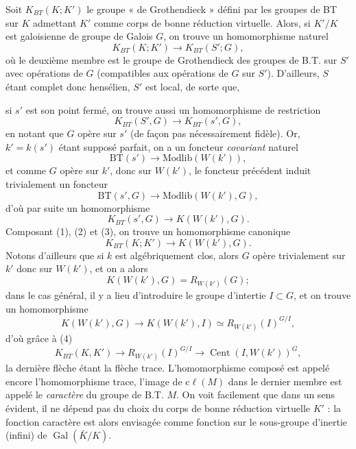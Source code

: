\documentclass[11pt,a4paper]{article}
\begin{document}
Soit $K_{BT}(K; K')$ le groupe « de Grothendieck » défini par les groupes
de BT sur $K$ admettant $K'$ comme corps de bonne réduction virtuelle.
Alors, si $K'/K$ est galoisienne de groupe de Galois $G$, on trouve un
homomorphisme naturel
\[
K_{BT}(K; K') \longrightarrow K_{BT}(S'; G) , \tag{1}
\]
où le deuxième membre est le groupe de Grothendieck des groupes de B.T.
sur $S'$ avec opérations de $G$ (compatibles aux opérations de $G$ sur
$S'$).
D'ailleurs, $S$ étant complet donc hensélien, $S'$ est local, de sorte que,


si $s'$ est son point fermé, on trouve aussi un homomorphisme de
restriction
\[
K_{BT}(S', G) \to K_{BT}(s', G) , \tag{2}
\]
en notant que $G$ opère sur $s'$ (de façon pas nécessairement fidèle).
Or, $k' = k(s')$ étant supposé  parfait, on a un foncteur
\emph{covariant} naturel
\[
\mathrm{BT}(s') \to \mathrm{Modlib}(W(k')) ,
\]
et comme $G$ opère sur $k'$, donc sur $W(k')$, le foncteur précédent induit
trivialement un foncteur
\[
\mathrm{BT}(s', G) \to \mathrm{Modlib}(W(k'), G) ,
\]
d'où par suite un homomorphisme
\[
K_{BT}(s', G) \longrightarrow K(W(k'), G) . \tag{3}
\]
Composant (1), (2) et (3), on trouve un homomorphisme canonique
\[
K_{BT}(K; K') \longrightarrow K(W(k'), G) . \tag{4}
\]
Notons d'ailleurs que si $k$ est algébriquement clos, alors $G$ opère
trivialement sur $k'$ donc sur $W(k')$, et on a alors
\[
K(W(k'), G) = R_{W(k')}(G) ;
\]
dans le cas général, il y a lieu d'introduire le groupe
d'intertie $I \subset G$, et on
trouve un homomorphisme
\[
K(W(k'), G) \to K(W(k'), I) \simeq R_{W(k')}(I)^{G/I} ,
\]
d'où grâce à (4)
\[
K_{BT}(K, K') \to R_{W(k')}(I)^{G/I} \longrightarrow
\operatorname{Cent}(I, W(k'))^{G} , \tag{5}
\]
la dernière flèche étant la flèche trace. L'homomorphisme composé est
appelé encore l'homomorphisme trace, l'image de $\mathrm{c}\ell(M)$ dans le
dernier membre est appelé le \emph{caractère} du groupe de B.T. $M$. On
voit facilement que dans un sens évident, il ne dépend pas du choix du corps
de bonne réduction virtuelle $K'$ : la fonction caractère est alors
envisagée comme fonction sur le sous-groupe d'inertie (infini) de
$\operatorname{Gal}(\bar K/K)$.
\end{document}
